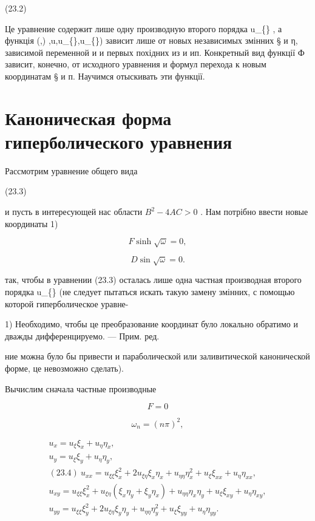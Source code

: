 \documentclass[
  ukrainian,
]{article}
\begin{document}
(23.2)

Це уравнение содержит лише одну производную второго порядка
u\_\{\xi\eta\} , а функція \Phi(\xi,) \eta,u,u\_\{\xi\},u\_\{\eta\})
зависит лише от новых независимых змінних § и η, зависимой переменной и
и первых похідних из и ип. Конкретный вид функції Ф зависит, конечно, от
исходного уравнения и формул перехода к новым координатам § и п.
Научимся отыскивать эти функції.

\section{Каноническая форма гиперболического
уравнения}\label{ux43aux430ux43dux43eux43dux438ux447ux435ux441ux43aux430ux44f-ux444ux43eux440ux43cux430-ux433ux438ux43fux435ux440ux431ux43eux43bux438ux447ux435ux441ux43aux43eux433ux43e-ux443ux440ux430ux432ux43dux435ux43dux438ux44f}

Рассмотрим уравнение общего вида

(23.3)

и пусть в интересующей нас области \(B^2 - 4AC > 0\) . Нам потрібно
ввести новые координаты 1)

\[
F \sinh \sqrt{\omega} = 0,
\]

\[
D \sin \sqrt{\omega} = 0.
\]

так, чтобы в уравнении (23.3) осталась лише одна частная производная
второго порядка u\_\{\xi\eta\} (не следует пытаться искать такую замену
змінних, с помощью которой гиперболическое уравне-

1) Необходимо, чтобы це преобразование координат було локально обратимо
и дважды дифференцируемо. --- Прим. ред.

ние можна було бы привести и параболической или заливитической
канонической форме, це невозможно сделать).

Вычислим сначала частные производные

\[
F = 0
\]

\[
\omega_n = (n\pi)^2,
\]

\[
\begin{aligned} u_x = u_\xi \xi_x + u_\eta \eta_x, \\ u_y = u_\xi \xi_y + u_\eta \eta_y, \\ (23.4) \ u_{xx} = u_{\xi\xi} \xi_x^2 + 2u_{\xi\eta} \xi_x \eta_x + u_{\eta\eta} \eta_x^2 + u_{\xi} \xi_{xx} + u_{\eta} \eta_{xx}, \\ u_{xy} = u_{\xi\xi} \xi_x^2 + u_{\xi\eta} (\xi_x \eta_y + \xi_y \eta_x) + u_{\eta\eta} \eta_x \eta_y + u_{\xi} \xi_{xy} + u_{\eta} \eta_{xy}, \\ u_{yy} = u_{\xi\xi} \xi_y^2 + 2u_{\xi\eta} \xi_y \eta_y + u_{\eta\eta} \eta_y^2 + u_{\xi} \xi_{yy} + u_{\eta} \eta_{yy}. \end{aligned}
\]
\end{document}
